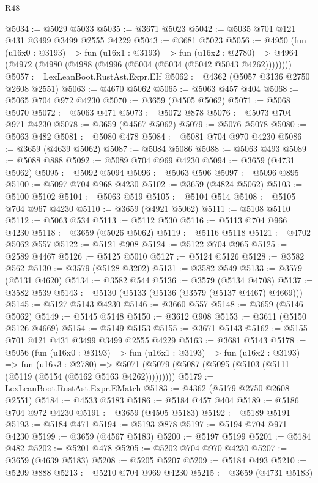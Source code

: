 \begin{lexlean}{R48}
\begin{coremodule}
@5034 := @5029 @5033
@5035 := @3671 @5023
@5042 := @5035 @701 @121 @431 @3499 @3499 @2555 @4229
@5043 := @3681 @5023
@5056 := @4950
    (fun (u16x0 : @3193) =>
    fun (u16x1 : @3193) =>
    fun (u16x2 : @2780) =>
    @4964 (@4972 (@4980 (@4988 (@4996 (@5004 (@5034 (@5042 @5043 @4262))))))))
@5057 := LexLeanBoot.RustAst.Expr.EIf
@5062 := @4362 (@5057 @3136 @2750 @2608 @2551)
@5063 := @4670 @5062
@5065 := @5063 @457 @404
@5068 := @5065 @704 @972 @4230
@5070 := @3659 (@4505 @5062)
@5071 := @5068 @5070
@5072 := @5063 @471
@5073 := @5072 @878
@5076 := @5073 @704 @971 @4230
@5078 := @3659 (@4567 @5062)
@5079 := @5076 @5078
@5080 := @5063 @482
@5081 := @5080 @478
@5084 := @5081 @704 @970 @4230
@5086 := @3659 (@4639 @5062)
@5087 := @5084 @5086
@5088 := @5063 @493
@5089 := @5088 @888
@5092 := @5089 @704 @969 @4230
@5094 := @3659 (@4731 @5062)
@5095 := @5092 @5094
@5096 := @5063 @506
@5097 := @5096 @895
@5100 := @5097 @704 @968 @4230
@5102 := @3659 (@4824 @5062)
@5103 := @5100 @5102
@5104 := @5063 @519
@5105 := @5104 @514
@5108 := @5105 @704 @967 @4230
@5110 := @3659 (@4921 @5062)
@5111 := @5108 @5110
@5112 := @5063 @534
@5113 := @5112 @530
@5116 := @5113 @704 @966 @4230
@5118 := @3659 (@5026 @5062)
@5119 := @5116 @5118
@5121 := @4702 @5062 @557
@5122 := @5121 @908
@5124 := @5122 @704 @965
@5125 := @2589 @4467
@5126 := @5125 @5010
@5127 := @5124 @5126
@5128 := @3582 @562
@5130 := @3579 (@5128 @3202)
@5131 := @3582 @549
@5133 := @3579 (@5131 @4620)
@5134 := @3582 @544
@5136 := @3579 (@5134 @4708)
@5137 := @3582 @539
@5143 := @5130 (@5133 (@5136 (@3579 (@5137 @4467) @4669)))
@5145 := @5127 @5143 @4230
@5146 := @3660 @557
@5148 := @3659 (@5146 @5062)
@5149 := @5145 @5148
@5150 := @3612 @908
@5153 := @3611 (@5150 @5126 @4669)
@5154 := @5149 @5153
@5155 := @3671 @5143
@5162 := @5155 @701 @121 @431 @3499 @3499 @2555 @4229
@5163 := @3681 @5143
@5178 := @5056
    (fun (u16x0 : @3193) =>
    fun (u16x1 : @3193) =>
    fun (u16x2 : @3193) =>
    fun (u16x3 : @2780) =>
    @5071 (@5079 (@5087 (@5095 (@5103 (@5111 (@5119 (@5154 (@5162 @5163 @4262)))))))))
@5179 := LexLeanBoot.RustAst.Expr.EMatch
@5183 := @4362 (@5179 @2750 @2608 @2551)
@5184 := @4533 @5183
@5186 := @5184 @457 @404
@5189 := @5186 @704 @972 @4230
@5191 := @3659 (@4505 @5183)
@5192 := @5189 @5191
@5193 := @5184 @471
@5194 := @5193 @878
@5197 := @5194 @704 @971 @4230
@5199 := @3659 (@4567 @5183)
@5200 := @5197 @5199
@5201 := @5184 @482
@5202 := @5201 @478
@5205 := @5202 @704 @970 @4230
@5207 := @3659 (@4639 @5183)
@5208 := @5205 @5207
@5209 := @5184 @493
@5210 := @5209 @888
@5213 := @5210 @704 @969 @4230
@5215 := @3659 (@4731 @5183)

\end{coremodule}
\end{lexlean}
